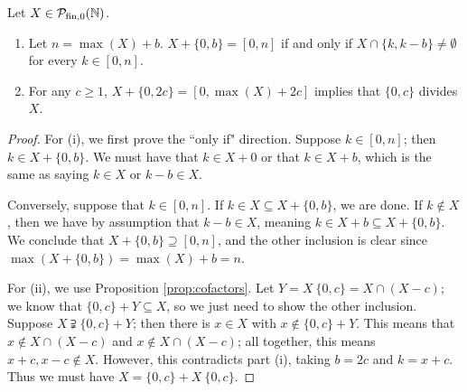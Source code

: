 \begin{prop} \label{prop:2-elt factor/cofactor}
	Let $X\in {\mathcal{P}_{\textrm{fin},0}(\mathbb{N})}$.
	\begin{enumerate}[label={\rm (\roman{*})}]
		\item Let $n = \max(X) + b$. $X + \{0,b\} = [ 0,n ]$ if and only if $X \cap \{k,k-b\} \neq \emptyset$ for every $k\in [ 0,n ]$.
		\item For any $c\ge 1$, $X + \{0,2c\} = [ 0,\max(X)+2c ]$ implies that $\{0,c\}$ divides $X$.
	\end{enumerate}
\end{prop}

\begin{proof}
	For (i), we first prove the ``only if" direction.  
	Suppose $k\in [ 0,n ]$; then $k\in X + \{0,b\}$.
	We must have that $k\in X + 0$ or that $k \in X + b$, which is the same as saying $k\in X$ or $k-b\in X$.
	
	Conversely, suppose that $k\in [ 0,n ]$.
	If $k\in X \subseteq X + \{0,b\}$, we are done.
	If $k\notin X$, then we have by assumption that $k-b\in X$, meaning $k\in X +b \subseteq X+ \{0,b\}$.
	We conclude that $X + \{0,b\} \supseteq [ 0,n ]$, and the other inclusion is clear since $\max(X+\{0,b\}) = \max(X) + b = n$.
	
	For (ii), we use Proposition \ref{prop:cofactors}.
	Let $Y = X\:\{0,c\} = X\cap (X-c)$; we know that $\{0,c\} + Y \subseteq X$, so we just need to show the other inclusion.
	Suppose $X \supsetneqq \{0,c\} + Y$; then there is $x\in X$ with $x\notin \{0,c\} + Y$.
	This means that $x\notin X \cap (X-c)$ and $x \notin X \cap (X-c)$; all together, this means $x+c,x-c\notin X$.
	However, this contradicts part (i), taking $b = 2c$ and $k = x+c$.
	Thus we must have $X = \{0,c\} + X\:\{0,c\}$.
\end{proof}

